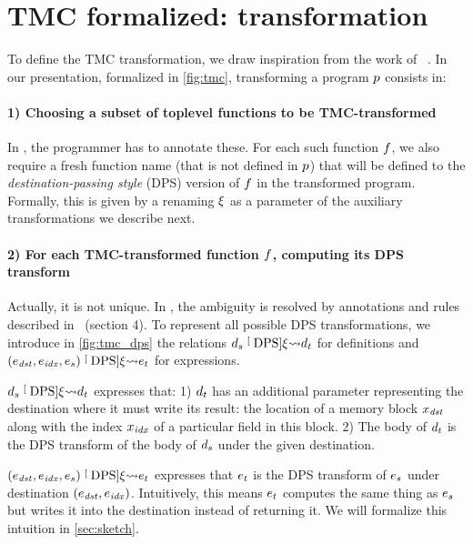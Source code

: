\section{TMC formalized: transformation}

To define the TMC transformation, we draw inspiration from the work of \citeauthor{DBLP:journals/corr/abs-2102-09823}~\cite{DBLP:journals/corr/abs-2102-09823}.
In our presentation, formalized in \cref{fig:tmc}, transforming a program $\datalangProg$ consists in:

\paragraph{1) Choosing a subset of toplevel functions to be TMC-transformed}
In \OCaml, the programmer has to annotate these.
For each such function $\datalangFn$, we also require a fresh function name (that is not defined in $\datalangProg$) that will be defined to the \emph{destination-passing style} (DPS) version of $\datalangFn$ in the transformed program.
Formally, this is given by a renaming $\xi$ as a parameter of the auxiliary transformations we describe next.

\paragraph{2) For each TMC-transformed function $\datalangFn$, computing its DPS transform}
Actually, it is not unique.
In \OCaml, the ambiguity is resolved by annotations and rules described in~\cite{DBLP:journals/corr/abs-2102-09823} (section 4).
To represent all possible DPS transformations, we introduce in \cref{fig:tmc_dps} the relations $\datalangDef_s \tmcDps{\datalangRenaming} \datalangDef_t$ for definitions and $(\datalangExpr_\mathit{dst}, \datalangExpr_\mathit{idx}, \datalangExpr_s) \tmcDps{\datalangRenaming} \datalangExpr_t$ for expressions.

$\datalangDef_s \tmcDps{\datalangRenaming} \datalangDef_t$ expresses that:
1) $\datalangDef_t$ has an additional parameter representing the destination where it must write its result: the location of a memory block $\datalangVar_\mathit{dst}$ along with the index $\datalangVar_\mathit{idx}$ of a particular field in this block.
2) The body of $\datalangDef_t$ is the DPS transform of the body of $\datalangDef_s$ under the given destination.

$(\datalangExpr_\mathit{dst}, \datalangExpr_\mathit{idx}, \datalangExpr_s) \tmcDps{\datalangRenaming} \datalangExpr_t$ expresses that $\datalangExpr_t$ is the DPS transform of $\datalangExpr_s$ under destination $(\datalangExpr_\mathit{dst}, \datalangExpr_\mathit{idx})$.
Intuitively, this means $\datalangExpr_t$ computes the same thing as $\datalangExpr_s$ but writes it into the destination instead of returning it.
We will formalize this intuition in \cref{sec:sketch}.

